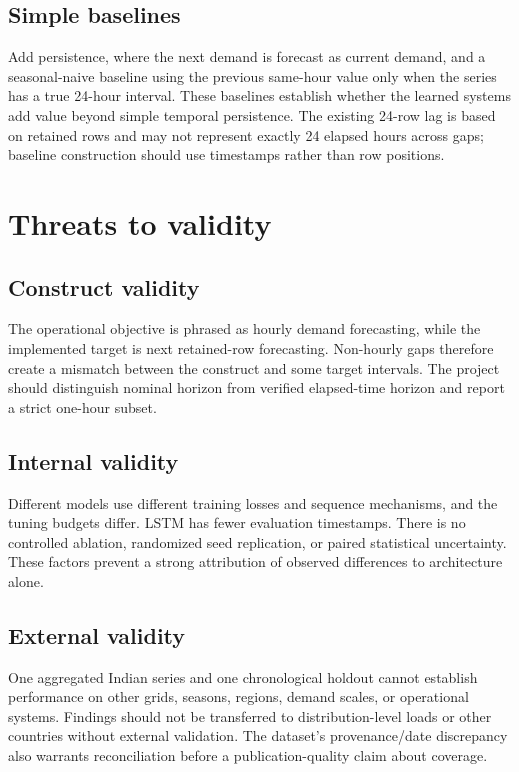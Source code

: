 \documentclass[12pt,a4paper]{article}
\begin{document}
\subsection{Simple baselines}
Add persistence, where the next demand is forecast as current demand, and a seasonal-naive baseline using the previous same-hour value only when the series has a true 24-hour interval. These baselines establish whether the learned systems add value beyond simple temporal persistence. The existing 24-row lag is based on retained rows and may not represent exactly 24 elapsed hours across gaps; baseline construction should use timestamps rather than row positions.

\newpage
\section{Threats to validity}
\subsection{Construct validity}
The operational objective is phrased as hourly demand forecasting, while the implemented target is next retained-row forecasting. Non-hourly gaps therefore create a mismatch between the construct and some target intervals. The project should distinguish nominal horizon from verified elapsed-time horizon and report a strict one-hour subset.

\subsection{Internal validity}
Different models use different training losses and sequence mechanisms, and the tuning budgets differ. LSTM has fewer evaluation timestamps. There is no controlled ablation, randomized seed replication, or paired statistical uncertainty. These factors prevent a strong attribution of observed differences to architecture alone.

\subsection{External validity}
One aggregated Indian series and one chronological holdout cannot establish performance on other grids, seasons, regions, demand scales, or operational systems. Findings should not be transferred to distribution-level loads or other countries without external validation. The dataset's provenance/date discrepancy also warrants reconciliation before a publication-quality claim about coverage.
\end{document}
